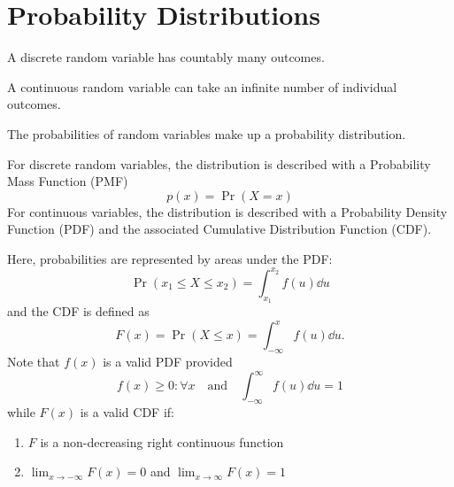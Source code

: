 \documentclass{article}
\begin{document}
\section{Probability Distributions}
\begin{definition}
    A discrete random variable has countably many outcomes.
\end{definition}
\begin{definition}
    A continuous random variable can take an infinite number of individual outcomes.
\end{definition}
\begin{definition}
    The probabilities of random variables make up a probability distribution.

    For discrete random variables, the distribution is described with a Probability
    Mass Function (PMF)
    \begin{equation*}
        p(x) = \Pr{\left( X = x \right)}
    \end{equation*}
    For continuous variables, the distribution is described with a Probability
    Density Function (PDF) and the associated Cumulative Distribution Function (CDF).

    Here, probabilities are represented by areas under the PDF:
    \begin{equation*}
        \Pr{\left( x_1 \leq X \leq x_2 \right)} = \int_{x_1}^{x_2} f(u) \dd{u}
    \end{equation*}
    and the CDF is defined as
    \begin{equation*}
        F(x) = \Pr{\left( X \leq x \right)} = \int_{-\infty}^{x} f(u) \dd{u}.
    \end{equation*}
    Note that $f(x)$ is a valid PDF provided
    \begin{equation*}
        f(x) \geq 0:\forall x \quad \text{and} \quad \int_{-\infty}^{\infty} f(u) \dd{u} = 1
    \end{equation*}
    while $F(x)$ is a valid CDF if:
    \begin{enumerate}
        \item $F$ is a non-decreasing right continuous function
        \item $\lim_{x\to-\infty} F(x) = 0$ and $\lim_{x\to\infty} F(x) = 1$
    \end{enumerate}
\end{definition}
\end{document}
